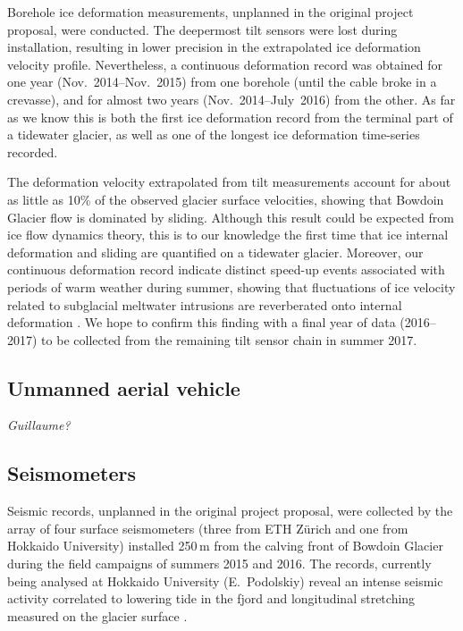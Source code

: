\documentclass{article}
\begin{document}
Borehole ice deformation measurements, unplanned in the original project
proposal, were conducted. The deepermost tilt sensors were lost during
installation, resulting in lower
precision in the extrapolated ice deformation velocity profile. Nevertheless, a
continuous deformation record was obtained for one year (Nov.~2014--Nov.~2015)
from one borehole (until the cable broke in a crevasse), and for almost two
years (Nov.~2014--July~2016) from the other. As far as we know this is both the
first ice deformation record from the terminal part of a tidewater glacier, as
well as one of the longest ice deformation time-series recorded.

The deformation velocity extrapolated from tilt measurements account for about
as little as 10\% of the observed glacier surface velocities, showing that
Bowdoin Glacier flow is dominated by sliding. Although this result could be
expected from ice flow dynamics theory, this is to our knowledge the first time
that ice internal deformation and sliding are quantified on a tidewater
glacier. Moreover, our continuous deformation record indicate distinct speed-up
events associated with periods of warm weather during summer, showing that
fluctuations of ice velocity related to subglacial meltwater intrusions are
reverberated onto internal deformation \citep{Seguinot.etal.inprepb}. We hope
to confirm this finding with a final year of data (2016--2017) to be collected
from the remaining tilt sensor chain in summer 2017.


\subsection{Unmanned aerial vehicle}

\emph{Guillaume?}


\subsection{Seismometers}

Seismic records, unplanned in the original project proposal, were collected by
the array of four surface seismometers (three from ETH Zürich and one from
Hokkaido University) installed 250\,m from the calving front of Bowdoin Glacier
during the field campaigns of summers 2015 and 2016. The records, currently
being analysed at Hokkaido University (E.~Podolskiy) reveal an intense seismic
activity correlated to lowering tide in the fjord and longitudinal stretching
measured on the glacier surface \citep{Podoslkiy.etal.2016}.
\end{document}
